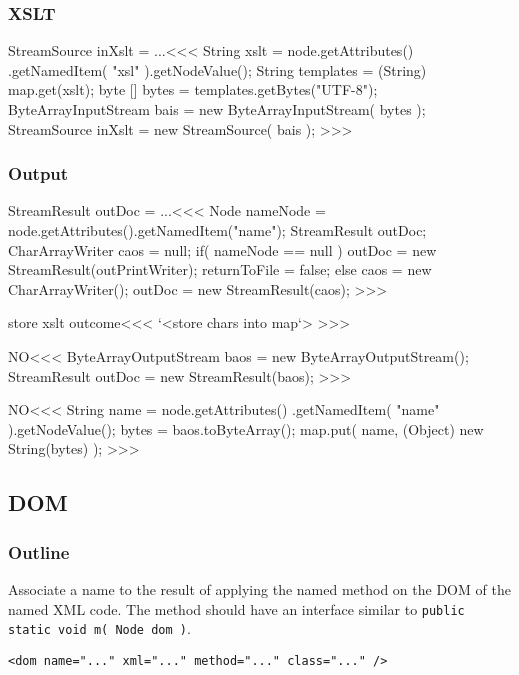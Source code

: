 \documentclass{article}
\begin{document}
{%
\subsubsection{XSLT}

\<StreamSource inXslt = ...\><<<
String xslt = node.getAttributes()
                  .getNamedItem( "xsl" ).getNodeValue();
String templates = (String) map.get(xslt);
byte [] bytes = templates.getBytes("UTF-8");
ByteArrayInputStream bais =  new ByteArrayInputStream( bytes );
StreamSource inXslt = new StreamSource( bais );
>>>


\subsubsection{Output}



\<StreamResult outDoc = ...\><<<
Node nameNode = node.getAttributes().getNamedItem("name");
StreamResult outDoc;
CharArrayWriter caos = null;
if( nameNode == null ){
   outDoc = new StreamResult(outPrintWriter);
   returnToFile = false;
} else {
   caos = new CharArrayWriter();
   outDoc  = new StreamResult(caos);
}
>>>


\<store xslt outcome\><<<
`<store chars into map`>
>>>





\<NO\><<<
ByteArrayOutputStream baos = new ByteArrayOutputStream();
StreamResult outDoc  = new StreamResult(baos);
>>>


\<NO\><<<
String name = node.getAttributes()
                .getNamedItem( "name" ).getNodeValue();
bytes = baos.toByteArray();
map.put( name, (Object) new String(bytes) );
>>>


\subsection{DOM}


\subsubsection{Outline}


Associate a name to the result of applying the named method on the DOM
of the named XML code. The method should have an interface similar to
\verb+public static void m( Node dom )+.

\begin{verbatim}
<dom name="..." xml="..." method="..." class="..." />
\end{verbatim}


}
\end{document}

